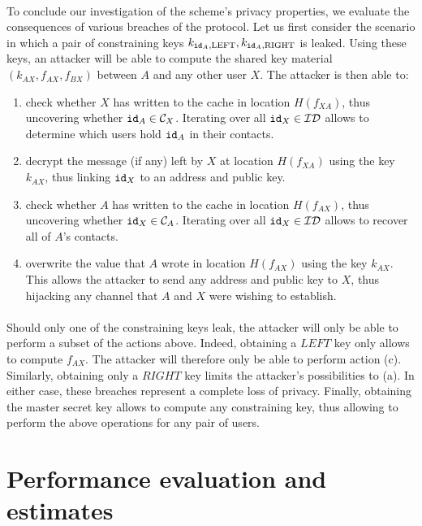 	\paragraph{} To conclude our investigation of the scheme's privacy properties, we evaluate the consequences of various breaches of the protocol. Let us first consider the scenario in which a pair of constraining keys $k_{\mathtt{id}_A,\mathrm{LEFT}}, k_{\mathtt{id}_A,\mathrm{RIGHT}}$ is leaked. Using these keys, an attacker will be able to compute the shared key material $(k_{AX}, f_{AX}, f_{BX})$ between $A$ and any other user $X$. The attacker is then able to:
	\begin{enumerate}[label=(\alph*)]
		\item check whether $X$ has written to the cache in location $H(f_{XA})$, thus uncovering whether $\mathtt{id}_A \in \mathcal{C}_{X}$. Iterating over all $\mathtt{id}_X \in \mathcal{ID}$ allows to determine which users hold $\mathtt{id}_A$ in their contacts. 
		\item decrypt the message (if any) left by $X$ at location $H(f_{XA})$ using the key $k_{AX}$, thus linking $\mathtt{id}_X$ to an address and public key.
		\item check whether $A$ has written to the cache in location $H(f_{AX})$, thus uncovering whether $\mathtt{id}_X \in \mathcal{C}_{A}$. Iterating over all $\mathtt{id}_X \in \mathcal{ID}$ allows to recover all of $A$'s contacts.
		\item overwrite the value that $A$ wrote in location $H(f_{AX})$ using the key $k_{AX}$. This allows the attacker to send any address and public key to $X$, thus hijacking any channel that $A$ and $X$ were wishing to establish.
	\end{enumerate}
	
	\paragraph{} Should only one of the constraining keys leak, the attacker will only be able to perform a subset of the actions above. Indeed, obtaining a $LEFT$ key only allows to compute $f_{AX}$. The attacker will therefore only be able to perform action (c). Similarly, obtaining only a $RIGHT$ key limits the attacker's possibilities to (a). In either case, these breaches represent a complete loss of privacy. Finally, obtaining the master secret key allows to compute any constraining key, thus allowing to perform the above operations for any pair of users.


\section{Performance evaluation and estimates}
\label{sec:performance}



